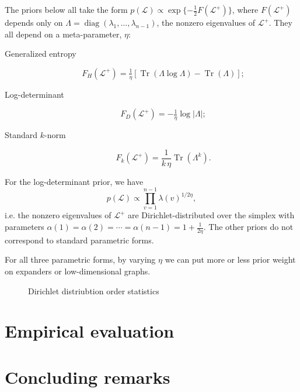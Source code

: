 \documentclass[12pt]{article}
\DeclareMathOperator*{\Tr}{Tr}
\DeclareMathOperator*{\diag}{diag}
\theoremstyle{plain}
\begin{document}
The priors below all take the form $p(\mathcal{L}) \propto
\exp\{-\tfrac{1}{2} F(\mathcal{L}^{+})\}$, where $F(\mathcal{L}^{+})$
depends only on $\Lambda = \diag(\lambda_1, \dotsc, \lambda_{n-1})$, the nonzero
eigenvalues of $\mathcal{L}^{+}$.  They all depend on a
meta-parameter, $\eta$:

\begin{description}
  \item[Generalized entropy]
    \[
      F_H(\mathcal{L}^+) = \tfrac{1}{\eta}[ \Tr( \Lambda \log \Lambda)
      - \Tr(\Lambda)];
    \]
  \item[Log-determinant]
    \[
      F_D(\mathcal{L}^{+}) = - \tfrac{1}{\eta} \log |\Lambda|;
    \]
  \item[Standard $k$-norm]
    \[
      F_k(\mathcal{L}^+)
        = \frac{1}{k \, \eta} \Tr(\Lambda^k).
  \]
\end{description}
 
For the log-determinant prior, we have
\[
  p(\mathcal{L})
    \propto \prod_{v=1}^{n-1} \lambda(v)^{1/2 \eta},
\]
i.e. the nonzero eigenvalues of $\mathcal{L}^{+}$ are
Dirichlet-distributed over the simplex with parameters $\alpha(1) =
\alpha(2) = \dotsb = \alpha(n-1) = 1 + \tfrac{1}{2\eta}$.  The other
priors do not correspond to standard parametric forms.

For all three parametric forms, by varying $\eta$ we can put more or
less prior weight on expanders or low-dimensional graphs.

\begin{figure}
    \centering
    \caption{Dirichlet distriubtion order statistics}
\end{figure}

\section{Empirical evaluation}

\section{Concluding remarks}



\end{document}
